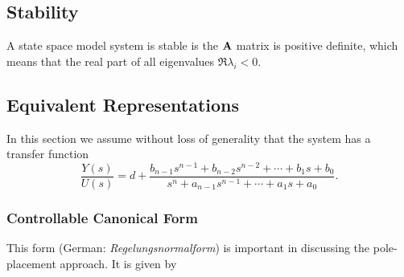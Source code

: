\subsection{Stability} \label{sec:stability}

A state space model system is stable is the \(\bm{\mathrm{A}}\) matrix is positive definite, which means that the real part of all eigenvalues \(\Re{\lambda_i} < 0\).


\subsection{Equivalent Representations}

In this section we assume without loss of generality that the system has a transfer function
\[
	\frac{Y(s)}{U(s)} = d + \frac{
		b_{n-1} s^{n-1} + b_{n-2} s^{n-2} + \cdots + b_1 s + b_0
	}{
		s^n + a_{n-1} s^{n-1} + \cdots + a_1 s + a_0
	}.
\]

\subsubsection{Controllable Canonical Form}

This form (German: \textsl{Regelungsnormalform}) is important in discussing the pole-placement approach. It is given by

